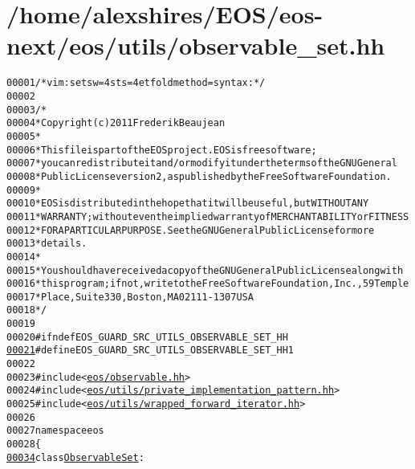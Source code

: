 \hypertarget{observable__set_8hh_source}{
\section{/home/alexshires/EOS/eos-\/next/eos/utils/observable\_\-set.hh}
}


\begin{footnotesize}\begin{alltt}
00001 \textcolor{comment}{/* vim: set sw=4 sts=4 et foldmethod=syntax : */}
00002 
00003 \textcolor{comment}{/*}
00004 \textcolor{comment}{ * Copyright (c) 2011 Frederik Beaujean}
00005 \textcolor{comment}{ *}
00006 \textcolor{comment}{ * This file is part of the EOS project. EOS is free software;}
00007 \textcolor{comment}{ * you can redistribute it and/or modify it under the terms of the GNU General}
00008 \textcolor{comment}{ * Public License version 2, as published by the Free Software Foundation.}
00009 \textcolor{comment}{ *}
00010 \textcolor{comment}{ * EOS is distributed in the hope that it will be useful, but WITHOUT ANY}
00011 \textcolor{comment}{ * WARRANTY; without even the implied warranty of MERCHANTABILITY or FITNESS}
00012 \textcolor{comment}{ * FOR A PARTICULAR PURPOSE.  See the GNU General Public License for more}
00013 \textcolor{comment}{ * details.}
00014 \textcolor{comment}{ *}
00015 \textcolor{comment}{ * You should have received a copy of the GNU General Public License along with}
00016 \textcolor{comment}{ * this program; if not, write to the Free Software Foundation, Inc., 59 Temple}
00017 \textcolor{comment}{ * Place, Suite 330, Boston, MA  02111-1307  USA}
00018 \textcolor{comment}{ */}
00019 
00020 \textcolor{preprocessor}{#ifndef EOS\_GUARD\_SRC\_UTILS\_OBSERVABLE\_SET\_HH}
\hypertarget{observable__set_8hh_source_l00021}{}\hyperlink{observable__set_8hh_a382e94167f32774fcacf8952a2d8ec4e}{00021} \textcolor{preprocessor}{}\textcolor{preprocessor}{#define EOS\_GUARD\_SRC\_UTILS\_OBSERVABLE\_SET\_HH 1}
00022 \textcolor{preprocessor}{}
00023 \textcolor{preprocessor}{#include <\hyperlink{observable_8hh}{eos/observable.hh}>}
00024 \textcolor{preprocessor}{#include <\hyperlink{private__implementation__pattern_8hh}{eos/utils/private_implementation_pattern.hh}>}
00025 \textcolor{preprocessor}{#include <\hyperlink{wrapped__forward__iterator_8hh}{eos/utils/wrapped_forward_iterator.hh}>}
00026 
00027 \textcolor{keyword}{namespace }eos
00028 \{
\hypertarget{observable__set_8hh_source_l00034}{}\hyperlink{classeos_1_1ObservableSet}{00034}     \textcolor{keyword}{class }\hyperlink{classeos_1_1ObservableSet}{ObservableSet} :

\end{alltt}
\end{footnotesize}
